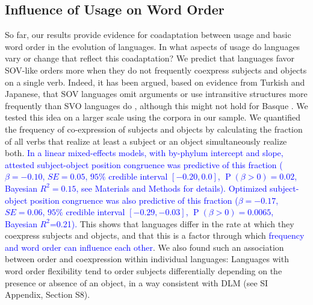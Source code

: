 \documentclass[9pt,twocolumn,twoside,lineno]{pnas-new}
\begin{document}
\subsection*{Influence of Usage on Word Order}
So far, our results provide evidence for coadaptation between usage and basic word order in the evolution of languages.
In what aspects of usage do languages vary or change that reflect this coadaptation?
We predict that languages favor SOV-like orders more when they do not frequently coexpress subjects and objects on a single verb.
Indeed, it has been argued, based on evidence from Turkish and Japanese, that SOV languages omit arguments or use intransitive structures more frequently than SVO languages do \citep{hiranuma1999syntactic,ueno2009does,luk2014investigating}, although this might not hold for Basque \citep{pastor2013processing}.
We tested this idea on a larger scale using the corpora in our sample.
We quantified the frequency of co-expression of subjects and objects by calculating the fraction of all verbs that realize at least a subject or an object simultaneously realize both.
\textcolor{blue}{In a linear mixed-effects models, with by-phylum intercept and slope, attested subject-object position congruence was predictive of this fraction ($\beta=-0.10$, $SE=0.05$, $95\%$ credible interval $[-0.20, 0.0]$, $\operatorname{P}(\beta>0) = 0.02$, Bayesian $R^2=0.15$, see Materials and Methods for details).} %
\textcolor{blue}{Optimized subject-object position congruence was also predictive of this fraction ($\beta=-0.17$, $SE=0.06$, $95\%$ credible interval $[-0.29,  -0.03]$, $\operatorname{P}(\beta>0) = 0.0065$, Bayesian $R^2$=0.21).} %
This shows that languages differ in the rate at which they coexpress subjects and objects, and that this is a factor through which \textcolor{blue}{frequency and word order can influence each other}.
We also found such an association between order and coexpression within individual languages: Languages with word order flexibility tend to order subjects differentially depending on the presence or absence of an object, in a way consistent with DLM (see SI Appendix, Section S8).



\end{document}
